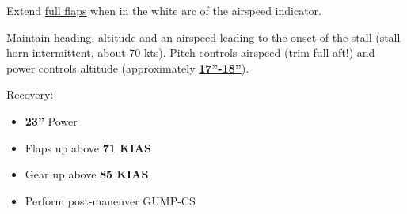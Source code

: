 Extend \underline{full flaps} when in the white arc of the airspeed indicator.

Maintain heading, altitude and an airspeed leading to the onset of the stall (stall horn intermittent, about 70 kts).
Pitch controls airspeed (trim full aft!) and power controls altitude (approximately \underline{\textbf{17''-18''}}).

Recovery:
\begin{itemize}[label={}]
\item \textbf{23''} Power
\item Flaps up above \textbf{71 KIAS}
\item Gear up above \textbf{85 KIAS}
\item Perform post-maneuver GUMP-CS
\end{itemize}

\newpage
